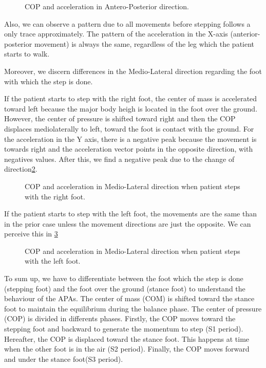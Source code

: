 \begin{figure}[H]
	\centering
	\caption{COP and acceleration in Antero-Posterior direction.}
	\label{fig:AP_AccX}
\end{figure}

Also, we can observe a pattern due to all movements before stepping follows a only trace approximately. The pattern of the acceleration in the X-axis (anterior-posterior movement) is always the same, regardless of the leg which the patient starts to walk.

Moreover, we discern differences in the Medio-Lateral direction regarding the foot with which the step is done. 

If the patient starts to step with the right foot, the center of mass is accelerated toward left because the major body heigh is located in the foot over the ground. However, the center of pressure is shifted toward right and then the COP displaces mediolaterally to left, toward the foot is contact with the ground. For the acceleration in the Y axis, there is a negative peak because the movement is towards right and the acceleration vector points in the opposite direction, with negatives values. After this, we find a negative peak due to the change of direction\ref{fig:ML_AccY_right}. 

\begin{figure}[H]
	\centering
	\caption{COP and acceleration in Medio-Lateral direction when patient steps with the right foot.}
	\label{fig:ML_AccY_right}
\end{figure}

If the patient starts to step with the left foot, the movements are the same than in the prior case unless the movement directions are just the opposite. We can perceive this in \ref{fig:ML_AccY_left}

\begin{figure}[H]
	\centering
	\caption{COP and acceleration in Medio-Lateral direction when patient steps with the left foot.}
	\label{fig:ML_AccY_left}
\end{figure}

To sum up, we have to differentiate between the foot which the step is done (stepping foot) and the foot over the ground (stance foot) to understand the behaviour of the APAs. The center of mass (COM) is shifted toward the stance foot to maintain the equilibrium during the balance phase. The center of pressure (COP) is divided in differents phases. Firstly, the COP moves toward the stepping foot and backward to generate the momentum to step (S1 period). Hereafter, the COP is displaced toward the stance foot. This happens at time when the other foot is in the air (S2 period). Finally, the COP moves forward and under the stance foot(S3 period). 

